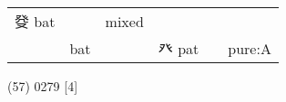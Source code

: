 \documentclass[14pt,a4paper]{scrartcl}
\begin{document}
\begin{longtable}[c]{@{}llllll@{}}
\begin{minipage}[t]{0.14\columnwidth}\raggedright\strut
癹 bat
\strut\end{minipage} &
\begin{minipage}[t]{0.14\columnwidth}\raggedright\strut
\strut\end{minipage} &
\begin{minipage}[t]{0.14\columnwidth}\raggedright\strut
mixed
\strut\end{minipage}\tabularnewline
\begin{minipage}[t]{0.14\columnwidth}\raggedright\strut
𣥠
\strut\end{minipage} &
\begin{minipage}[t]{0.14\columnwidth}\raggedright\strut
bat
\strut\end{minipage} &
\begin{minipage}[t]{0.14\columnwidth}\raggedright\strut
\strut\end{minipage} &
\begin{minipage}[t]{0.14\columnwidth}\raggedright\strut
癶 pat
\strut\end{minipage} &
\begin{minipage}[t]{0.14\columnwidth}\raggedright\strut
\strut\end{minipage} &
\begin{minipage}[t]{0.14\columnwidth}\raggedright\strut
pure:A
\strut\end{minipage}\tabularnewline
\bottomrule
\end{longtable}

(57) 0279 {[}4{]}
\end{document}
